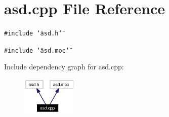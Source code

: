 \section{asd.cpp File Reference}
\label{asd_8cpp}


{\tt \#include \char`\"{}asd.h\char`\"{}}\par
{\tt \#include \char`\"{}asd.moc\char`\"{}}\par


Include dependency graph for asd.cpp:\begin{figure}[H]
\begin{center}
\leavevmode
\includegraphics[width=74pt]{asd_8cpp__incl}
\end{center}
\end{figure}
